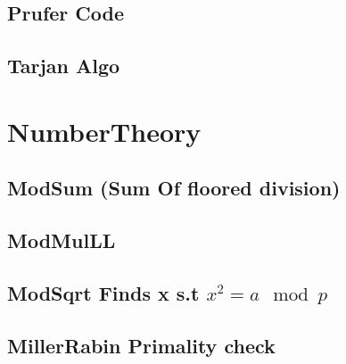 \subsection{Prufer Code}
\vspace{-2.3ex}
\raggedbottom
\vspace{-3.3ex}
\hrulefill
\vspace{-1ex}
\subsection{Tarjan Algo}
\vspace{-2.3ex}
\raggedbottom
\vspace{-3.3ex}
\hrulefill

\section{NumberTheory}
\vspace{-1ex}
\subsection{ModSum (Sum Of floored division)}
\vspace{-2.3ex}
\raggedbottom
\vspace{-3.3ex}
\hrulefill
\vspace{-1ex}
\subsection{ModMulLL}
\vspace{-2.3ex}
\raggedbottom
\vspace{-3.3ex}
\hrulefill
\vspace{-1ex}
\subsection{ModSqrt Finds x s.t ${x^2 = a \mod p}$}
\vspace{-2.3ex}
\raggedbottom
\vspace{-3.3ex}
\hrulefill
\vspace{-1ex}
\subsection{MillerRabin Primality check}
\vspace{-2.3ex}
\raggedbottom
\vspace{-3.3ex}
\hrulefill
\vspace{-1ex}
